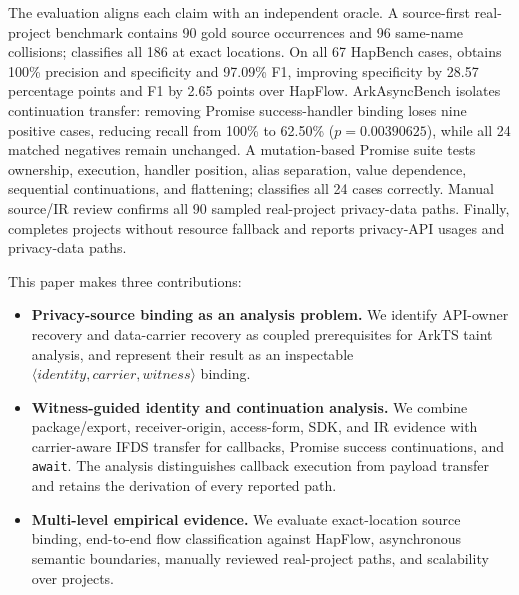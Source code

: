 The evaluation aligns each claim with an independent oracle. A source-first real-project benchmark contains 90 gold source occurrences and 96 same-name collisions; \mytool classifies all 186 at exact locations. On all 67 HapBench cases, \mytool obtains 100\% precision and specificity and 97.09\% F1, improving specificity by 28.57 percentage points and F1 by 2.65 points over HapFlow. ArkAsyncBench isolates continuation transfer: removing Promise success-handler binding loses nine positive cases, reducing recall from 100\% to 62.50\% ($p=0.00390625$), while all 24 matched negatives remain unchanged. A mutation-based Promise suite tests ownership, execution, handler position, alias separation, value dependence, sequential continuations, and flattening; \mytool classifies all 24 cases correctly. Manual source/IR review confirms all 90 sampled real-project privacy-data paths. Finally, \mytool completes \CorpusProjects{} projects without resource fallback and reports \CorpusApiOccurrences{} privacy-API usages and \CorpusPrivacyPaths{} privacy-data paths.

This paper makes three contributions:
\begin{itemize}
    \item \textbf{Privacy-source binding as an analysis problem.} We identify API-owner recovery and data-carrier recovery as coupled prerequisites for ArkTS taint analysis, and represent their result as an inspectable $\langle identity, carrier, witness\rangle$ binding.
    \item \textbf{Witness-guided identity and continuation analysis.} We combine package/export, receiver-origin, access-form, SDK, and IR evidence with carrier-aware IFDS transfer for callbacks, Promise success continuations, and \texttt{await}. The analysis distinguishes callback execution from payload transfer and retains the derivation of every reported path.
    \item \textbf{Multi-level empirical evidence.} We evaluate exact-location source binding, end-to-end flow classification against HapFlow, asynchronous semantic boundaries, manually reviewed real-project paths, and scalability over \CorpusProjects{} projects.
\end{itemize}
